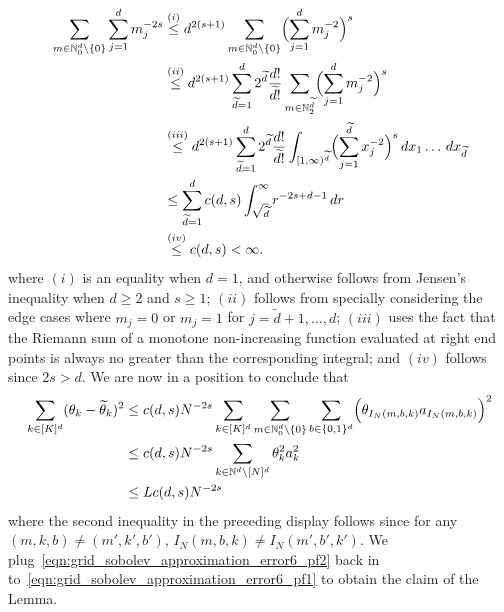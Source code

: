 \documentclass{article}
\newcommand{\1}{\mathbf{1}}
\newcommand{\Nbb}{\mathbb{N}}
\newcommand{\wt}[1]{\widetilde{#1}}
\theoremstyle{alden}
\theoremstyle{aldenthm}
\theoremstyle{definition}
\theoremstyle{remark}
\begin{document}
\begin{align*}
\sum_{m \in \Nbb_0^d \setminus \{0\}}\sum_{j = 1}^{d} m_j^{-2s} & \overset{(i)}{\leq} d^{2(s + 1)} \sum_{m \in \Nbb_0^d \setminus \{0\}} \Bigl(\sum_{j = 1}^{d} m_j^{-2}\Bigr)^s \\
& \overset{(ii)}{\leq} d^{2(s + 1)} \sum_{\wt{d} = 1}^{d} 2^{\wt{d}} \frac{d!}{\wt{d}!} \sum_{m \in \Nbb_2^{\wt{d}}} \Bigl(\sum_{j = 1}^{d} m_j^{-2}\Bigr)^s \\
& \overset{(iii)}{\leq} d^{2(s + 1)} \sum_{\wt{d} = 1}^{d} 2^{\wt{d}} \frac{d!}{\wt{d}!} \int_{[1,\infty)^{\wt{d}}} \Bigl(\sum_{j = 1}^{\wt{d}} x_j^{-2}\Bigr)^{s} \,dx_1 \ldots \,dx_{\wt{d}} \\
& \leq \sum_{\wt{d} = 1}^{d} c(d,s) \int_{\sqrt{\wt{d}}}^{\infty} r^{-2s + d - 1} \,dr \\
& \overset{(iv)}{\leq} c(d,s) < \infty.
\end{align*}
where $(i)$ is an equality when $d = 1$, and otherwise follows from Jensen's inequality when $d \geq 2$ and $s \geq 1$; $(ii)$ follows from specially considering the edge cases where $m_j = 0$ or $m_j = 1$ for $j = \wt{d} + 1,\ldots, d$; $(iii)$ uses the fact that the Riemann sum of a monotone non-increasing function evaluated at right end points is always no greater than the corresponding integral; and $(iv)$ follows since $2s > d$. We are now in a position to conclude that
\begin{align}
\sum_{k \in [K]^d} (\theta_k - \wt{\theta}_k)^2 & \leq c(d,s) N^{-2s} \sum_{k \in [K]^d} \sum_{m \in \Nbb_0^d \setminus \{0\}} \sum_{b \in \{0,1\}^d} \Bigl(\theta_{I_N(m,b,k)}a_{I_N(m,b,k)}\Bigr)^2 \nonumber \\
& \leq c(d,s) N^{-2s} \sum_{k \in \Nbb^d \setminus [N]^d} \theta_k^2 a_k^2 \nonumber \\
& \leq L c(d,s) N^{-2s} \label{eqn:grid_sobolev_approximation_error6_pf2}
\end{align}
where the second inequality in the preceding display follows since for any $(m,k,b) \neq (m',k',b')$, $I_N(m,b,k) \neq I_N(m',b',k')$. We plug~\eqref{eqn:grid_sobolev_approximation_error6_pf2} back in to~\eqref{eqn:grid_sobolev_approximation_error6_pf1} to obtain the claim of the Lemma.
\end{document}
